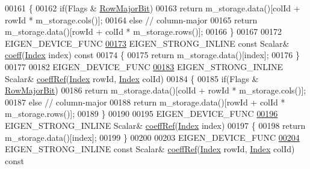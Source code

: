 \begin{DoxyCode}
00161 \textcolor{keyword}{    }\{
00162       \textcolor{keywordflow}{if}(Flags & \hyperlink{group__flags_gae4f56c2a60bbe4bd2e44c5b19cbe8762}{RowMajorBit})
00163         \textcolor{keywordflow}{return} m\_storage.data()[colId + rowId * m\_storage.cols()];
00164       \textcolor{keywordflow}{else} \textcolor{comment}{// column-major}
00165         \textcolor{keywordflow}{return} m\_storage.data()[rowId + colId * m\_storage.rows()];
00166     \}
00167 
00172     EIGEN\_DEVICE\_FUNC
\hyperlink{class_eigen_1_1_plain_object_base_af592e3993ea3d4ac9f073b42db2c04cc}{00173}     EIGEN\_STRONG\_INLINE \textcolor{keyword}{const} Scalar& \hyperlink{class_eigen_1_1_plain_object_base_af592e3993ea3d4ac9f073b42db2c04cc}{coeff}(\hyperlink{namespace_eigen_a62e77e0933482dafde8fe197d9a2cfde}{Index} index)\textcolor{keyword}{ const}
00174 \textcolor{keyword}{    }\{
00175       \textcolor{keywordflow}{return} m\_storage.data()[index];
00176     \}
00177 
00182     EIGEN\_DEVICE\_FUNC
\hyperlink{class_eigen_1_1_plain_object_base_a25626a55b26a4323565f79d1b7c48ea8}{00183}     EIGEN\_STRONG\_INLINE Scalar& \hyperlink{class_eigen_1_1_plain_object_base_a25626a55b26a4323565f79d1b7c48ea8}{coeffRef}(\hyperlink{namespace_eigen_a62e77e0933482dafde8fe197d9a2cfde}{Index} rowId, \hyperlink{namespace_eigen_a62e77e0933482dafde8fe197d9a2cfde}{Index} colId)
00184     \{
00185       \textcolor{keywordflow}{if}(Flags & \hyperlink{group__flags_gae4f56c2a60bbe4bd2e44c5b19cbe8762}{RowMajorBit})
00186         \textcolor{keywordflow}{return} m\_storage.data()[colId + rowId * m\_storage.cols()];
00187       \textcolor{keywordflow}{else} \textcolor{comment}{// column-major}
00188         \textcolor{keywordflow}{return} m\_storage.data()[rowId + colId * m\_storage.rows()];
00189     \}
00190 
00195     EIGEN\_DEVICE\_FUNC
\hyperlink{class_eigen_1_1_plain_object_base_a571632ed666076d7403c8bd3eece44f0}{00196}     EIGEN\_STRONG\_INLINE Scalar& \hyperlink{class_eigen_1_1_plain_object_base_a571632ed666076d7403c8bd3eece44f0}{coeffRef}(\hyperlink{namespace_eigen_a62e77e0933482dafde8fe197d9a2cfde}{Index} index)
00197     \{
00198       \textcolor{keywordflow}{return} m\_storage.data()[index];
00199     \}
00200 
00203     EIGEN\_DEVICE\_FUNC
\hyperlink{class_eigen_1_1_plain_object_base_ab1b33ee10e4c72ec5cf354d511900e62}{00204}     EIGEN\_STRONG\_INLINE \textcolor{keyword}{const} Scalar& \hyperlink{class_eigen_1_1_plain_object_base_ab1b33ee10e4c72ec5cf354d511900e62}{coeffRef}(\hyperlink{namespace_eigen_a62e77e0933482dafde8fe197d9a2cfde}{Index} rowId, \hyperlink{namespace_eigen_a62e77e0933482dafde8fe197d9a2cfde}{Index} colId)\textcolor{keyword}{ const}

\end{DoxyCode}
